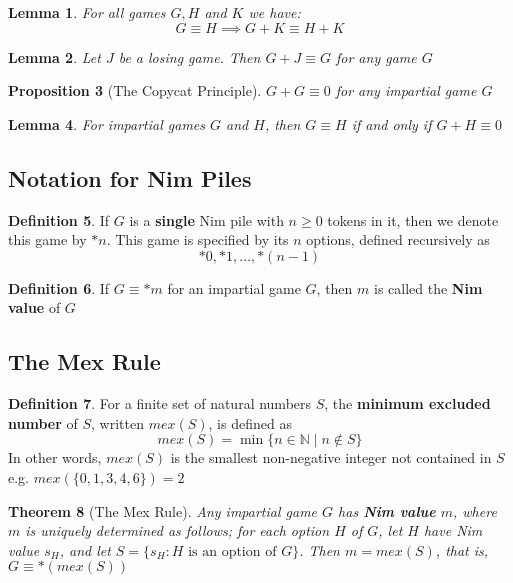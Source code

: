 \documentclass[11pt]{article}
\theoremstyle{plain}
\newtheorem{theorem}{Theorem}[section]
\newtheorem{lemma}[theorem]{Lemma}
\newtheorem{proposition}[theorem]{Proposition}
\theoremstyle{definition}
\newtheorem{definition}[theorem]{Definition}
\theoremstyle{remark}
\newcommand{\N}{\mathbb{N}}
\begin{document}
\begin{lemma}
    For all games \(G,H\) and \(K\) we have:
    \[
        G \equiv H \implies G + K \equiv H + K    
    \]
\end{lemma}

\begin{lemma}
    Let \(J\) be a losing game. Then \(G + J \equiv G\) for any game \(G\) 
\end{lemma}

\begin{proposition}[The Copycat Principle]
    \(G + G \equiv 0\) for any impartial game \(G\) 
\end{proposition}

\begin{lemma}
    For impartial games \(G\) and \(H\), then \(G \equiv H\)  if and only if \(G + H \equiv 0\) 
\end{lemma}

\setcounter{subsection}{4} 
\subsection{Notation for Nim Piles}

\begin{definition}
    If \(G\) is a \textbf{single} Nim pile with \(n \geq 0\) tokens in it, then we denote this game by \(*n\). This game is specified by its \(n\) options, defined recursively as
    \[
      *0, *1, \ldots , *(n-1)  
    \]
\end{definition}

\begin{definition}
    If \(G \equiv *m\) for an impartial game \(G\), then \(m\) is called the \textbf{Nim value} of \(G\) 
\end{definition}

\subsection{The Mex Rule}
\begin{definition}
    For a finite set of natural numbers \(S\), the \textbf{minimum excluded number} of \(S\), written \(mex(S)\), is defined as
    \[
        mex(S) = \min \{n \in \N \mid n \notin S\}  
    \]
    In other words, \(mex(S)\) is the smallest non-negative integer not contained in \(S\)
    e.g. \(mex(\{0,1,3,4,6\}) = 2\)
\end{definition}

\begin{theorem}[The Mex Rule]
    Any impartial game \(G\) has \textbf{Nim value} \(m\), where \(m\) is uniquely determined as follows;
    for each option \(H\) of \(G\), let \(H\) have Nim value \(s_{H}\), and let \(S = \{s_{H}: H \text{ is an option of } G\}\). Then \(m = mex(S)\), that is, \(G \equiv *(mex(S))\) 
\end{theorem}
\end{document}
